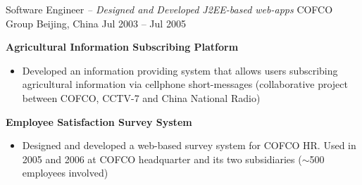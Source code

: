 \begin{cventries}
\cventry
{Software Engineer \textit{ -- Designed and Developed J2EE-based web-apps}}                   %
{COFCO Group}                         %
{Beijing, China}                      %
{Jul 2003 -- Jul 2005}                %
{
    \begin{cvitems}                          
    \item {
        \textbf{Agricultural Information Subscribing Platform} 
        \begin{itemize}
            \item  Developed an information providing system that allows users subscribing agricultural information via cellphone short-messages
                   (collaborative project between COFCO, CCTV-7 and China National Radio)
        \end{itemize} 
	}          
    \item {
        \textbf{Employee Satisfaction Survey System }
        \begin{itemize}
            \item  Designed and developed a web-based survey system for COFCO HR. 
                   Used in 2005 and 2006 at COFCO headquarter and its two subsidiaries ($\sim$500 employees involved)
        \end{itemize} 
	}        
    \end{cvitems}  %
}
\end{cventries}
